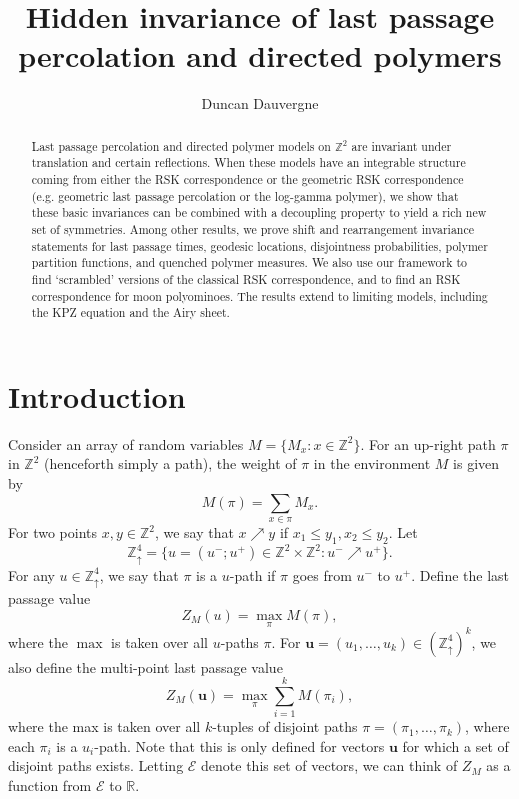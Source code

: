 \documentclass[aop, preprint]{imsart}
\theoremstyle{plain}
\theoremstyle{definition}
\theoremstyle{plain}
\newcommand{\scrE}{\mathcal{E}}
\newcommand{\Zd}{\mathds{Z}^4_\uparrow}
\newcommand{\Z}{\mathds{Z}}
\newcommand{\R}{\mathds{R}}
\newcommand{\X}{\times}
\newcommand{\bu}{\mathbf{u}}
\begin{document}
	
	\begin{frontmatter}
		
		\title{Hidden invariance of last passage percolation and directed polymers}
		\author{Duncan Dauvergne}

\begin{abstract} 
	\qquad Last passage percolation and directed polymer models on $\Z^2$ are invariant under translation and certain reflections. When these models have an integrable structure coming from either the RSK correspondence or the geometric RSK correspondence (e.g. geometric last passage percolation or the log-gamma polymer), we show that these basic invariances can be combined with a decoupling property to yield a rich new set of symmetries. Among other results, we prove shift and rearrangement invariance statements for last passage times, geodesic locations, disjointness probabilities, polymer partition functions, and quenched polymer measures. We also use our framework to find `scrambled' versions of the classical RSK correspondence, and to find an RSK correspondence for moon polyominoes. The results extend to limiting models, including the KPZ equation and the Airy sheet.
\end{abstract}

\begin{keyword}[class=MSC2010]
\end{keyword}

\begin{keyword}
\end{keyword}

\end{frontmatter}


\section{Introduction}
\label{S:intro}
Consider an array of random variables $M = \{M_x: x \in \Z^2\}$. For an up-right path $\pi$ in $\Z^2$ (henceforth simply a path), the weight of $\pi$ in the environment $M$ is given by
$$
M(\pi) = \sum_{x \in \pi} M_x.
$$
For two points $x, y \in \Z^2$, we say that $x \nearrow y$ if $x_1 \le y_1, x_2 \le y_2$. Let 
$$
\Zd = \{u = (u^-; u^+) \in \Z^2 \X \Z^2 : u^- \nearrow u^+ \}.
$$
For any $u \in \Zd$, we say that $\pi$ is a $u$-path if $\pi$ goes from $u^-$ to $u^+$. Define the last passage value
$$
Z_M(u) = \max_\pi M(\pi),
$$
where the $\max$ is taken over all $u$-paths $\pi$. For $\bu = (u_1, \dots, u_k) \in (\Zd)^k$, we also define the multi-point last passage value
$$
Z_M(\bu) = \max_\pi \sum_{i=1}^k M(\pi_i),
$$ 
where the max is taken over all $k$-tuples of disjoint paths $\pi = (\pi_1, \dots, \pi_k)$, where each $\pi_i$ is a $u_i$-path. Note that this is only defined for vectors $\bu$ for which a set of disjoint paths exists. Letting $\scrE$ denote this set of vectors, we can think of $Z_M$ as a function from $\scrE$ to $\R$.
\end{document}
